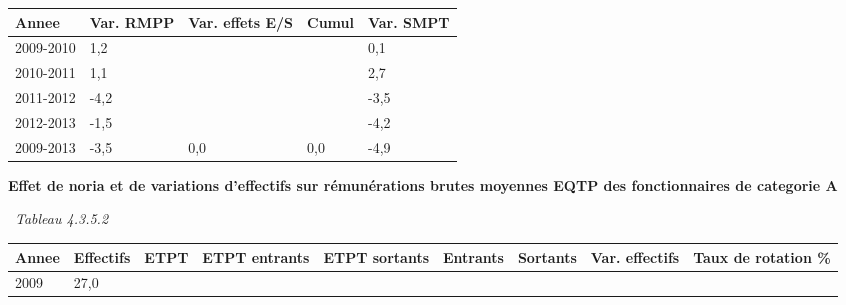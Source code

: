 \begin{longtable}[]{@{}lllll@{}}
\toprule
Annee & Var. RMPP & Var. effets E/S & Cumul & Var. SMPT\tabularnewline
\midrule
\endhead
2009-2010 & 1,2 & & & 0,1\tabularnewline
2010-2011 & 1,1 & & & 2,7\tabularnewline
2011-2012 & -4,2 & & & -3,5\tabularnewline
2012-2013 & -1,5 & & & -4,2\tabularnewline
2009-2013 & -3,5 & 0,0 & 0,0 & -4,9\tabularnewline
\bottomrule
\end{longtable}

\textbf{Effet de noria et de variations d'effectifs sur rémunérations
brutes moyennes EQTP des fonctionnaires de categorie A}

~\emph{Tableau 4.3.5.2}

\begin{longtable}[]{@{}lllllllll@{}}
\toprule
\begin{minipage}[b]{0.05\columnwidth}\raggedright
Annee\strut
\end{minipage} & \begin{minipage}[b]{0.08\columnwidth}\raggedright
Effectifs\strut
\end{minipage} & \begin{minipage}[b]{0.04\columnwidth}\raggedright
ETPT\strut
\end{minipage} & \begin{minipage}[b]{0.10\columnwidth}\raggedright
ETPT entrants\strut
\end{minipage} & \begin{minipage}[b]{0.10\columnwidth}\raggedright
ETPT sortants\strut
\end{minipage} & \begin{minipage}[b]{0.07\columnwidth}\raggedright
Entrants\strut
\end{minipage} & \begin{minipage}[b]{0.07\columnwidth}\raggedright
Sortants\strut
\end{minipage} & \begin{minipage}[b]{0.11\columnwidth}\raggedright
Var. effectifs\strut
\end{minipage} & \begin{minipage}[b]{0.14\columnwidth}\raggedright
Taux de rotation \%\strut
\end{minipage}\tabularnewline
\midrule
\endhead
\begin{minipage}[t]{0.05\columnwidth}\raggedright
2009\strut
\end{minipage} & \begin{minipage}[t]{0.08\columnwidth}\raggedright
27,0\strut
\end{minipage} & \begin{minipage}[t]{0.04\columnwidth}\raggedright

\end{minipage}
\end{longtable}
